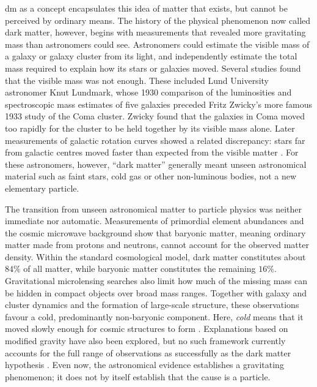\gls{dm} as a concept encapsulates this idea of matter that exists, but cannot
be perceived by ordinary means. The history of the physical phenomenon now
called dark matter, however, begins with measurements that revealed more
gravitating mass than astronomers could see. Astronomers could estimate the
visible mass of a galaxy or galaxy cluster from its light, and independently
estimate the total mass required to explain how its stars or galaxies moved.
Several studies found that the visible mass was not enough. These included Lund
University astronomer Knut Lundmark, whose 1930 comparison of the luminosities
and spectroscopic mass estimates of five galaxies preceded Fritz Zwicky's more
famous 1933 study of the Coma cluster. Zwicky found that the galaxies in Coma
moved too rapidly for the cluster to be held together by its visible mass alone.
Later measurements of galactic rotation curves showed a related discrepancy:
stars far from galactic centres moved faster than expected from the visible
matter \cite{lundmark1930-galaxy-masses,bertone2016-history-dark-matter,
orodruin2016-lundmark-darkmatter}. For these astronomers, however, ``dark
matter'' generally meant unseen astronomical material such as faint stars, cold
gas or other non-luminous bodies, not a new elementary particle.

The transition from unseen astronomical matter to particle physics was neither
immediate nor automatic. Measurements of primordial element abundances and the
cosmic microwave background show that baryonic matter, meaning ordinary matter
made from protons and neutrons, cannot account for the observed matter density.
Within the standard cosmological model, dark matter constitutes about \(84\%\)
of all matter, while baryonic matter constitutes the remaining \(16\%\).
Gravitational microlensing searches also limit how much of the missing mass can
be hidden in compact objects over broad mass ranges. Together with galaxy and
cluster dynamics and the formation of large-scale structure, these observations
favour a cold, predominantly non-baryonic component. Here, \emph{cold} means
that it moved slowly enough for cosmic structures to form
\cite{bertone2016-history-dark-matter,cirelli2026-darkmatter}. Explanations based
on modified gravity have also been explored, but no such framework currently
accounts for the full range of observations as successfully as the dark matter
hypothesis \cite{cirelli2026-darkmatter}. Even now, the astronomical evidence
establishes a gravitating phenomenon; it does not by itself establish that the
cause is a particle.


